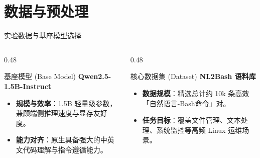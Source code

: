 \documentclass[aspectratio=169]{beamer}
\begin{document}
\section{数据与预处理}

\begin{frame}{实验数据与基座模型选择}
    \begin{columns}[T]
        \begin{column}{0.48\textwidth}
            \begin{block}{基座模型 (Base Model)}
                \textbf{Qwen2.5-1.5B-Instruct}
                \begin{itemize}
                    \item \textbf{规模与效率}：1.5B 轻量级参数，兼顾端侧推理速度与显存友好度。
                    \item \textbf{能力对齐}：原生具备强大的中英文代码理解与指令遵循能力。
                \end{itemize}
            \end{block}
        \end{column}
        
        \begin{column}{0.48\textwidth}
            \begin{block}{核心数据集 (Dataset)}
                \textbf{NL2Bash 语料库}\footnotemark
                \begin{itemize}
                    \item \textbf{数据规模}：精选总计约 10k 条高效「自然语言-Bash命令」对。
                    \item \textbf{任务目标}：覆盖文件管理、文本处理、系统监控等高频 Linux 运维场景。
                \end{itemize}
            \end{block}
        \end{column}
    \end{columns}
    
\end{frame}
\end{document}
